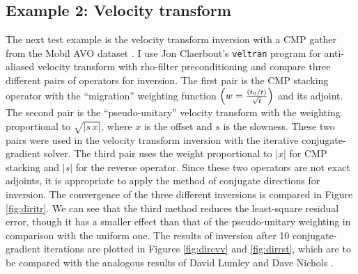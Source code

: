 \subsection{Example 2: Velocity transform}
The next test example is the velocity transform inversion with a CMP
gather from the Mobil AVO dataset
\cite{Nichols.sep.82.1,Lumley.sep.82.25,Lumley.sep.82.63}. I use Jon
Claerbout's \verb!veltran! program \cite{Claerbout.bei.95} for
anti-aliased velocity transform with rho-filter preconditioning
and compare three different pairs of operators for inversion. The
first pair is the CMP stacking operator with the ``migration''
weighting function $\left(w = {{\left(t_0/t\right)} \over
\sqrt{t}}\right)$ and its adjoint. The second pair is
the ``pseudo-unitary'' velocity transform with the weighting
proportional to $\sqrt{|s\,x|}$, where $x$ is the offset and $s$ is
the slowness. These two pairs were used in the velocity transform
inversion with the iterative conjugate-gradient solver. The third pair
uses the weight proportional to $|x|$ for CMP stacking and $|s|$ for
the reverse operator. Since these two operators are not exact
adjoints, it is appropriate to apply the method of conjugate
directions for inversion. The convergence of the three different
inversions is compared in Figure \ref{fig:diritr}. We can see that the
third method reduces the least-square residual error, though it has a
smaller effect than that of the pseudo-unitary weighting in comparison
with the uniform one. The results of inversion after 10
conjugate-gradient iterations are plotted in Figures \ref{fig:dircvv} and
\ref{fig:dirrst}, which are to be compared with the analogous results of
David Lumley  and Dave Nichols
.




